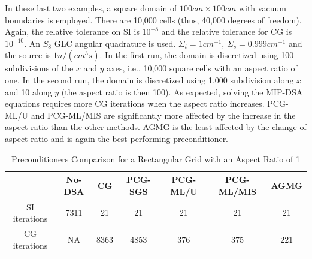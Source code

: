 \documentclass[preprint,10pt]{elsarticle}
\renewcommand{\(}{\left(}
\renewcommand{\)}{\right)}
\renewcommand{\[}{\left[}
\renewcommand{\]}{\right]}
\begin{document}
In these last two examples, a square domain  of $100cm \times 100cm$ with vacuum boundaries
is employed. There are 10,000 cells (thus, 40,000 degrees of freedom). Again, the relative 
tolerance on SI is $10^{-8}$ and the relative tolerance for CG is $10^{-10}$. 
An $S_8$ GLC angular quadrature is used. $\Sigma_t = 1cm^{-1}$, $\Sigma_s = 0.999cm^{-1}$
and the source is $1n/(cm^3s)$. 
In the first run, the domain is discretized using 100 subdivisions of the $x$ and $y$
axes, i.e., 10,000 square cells with an aspect ratio of one. In the second run, 
the domain is discretized using 1,000 subdivision along $x$ and 10 along $y$ 
(the aspect ratio is then 100).
%
As expected, solving the MIP-DSA equations requires more CG iterations when the aspect
ratio increases. PCG-ML/U and PCG-ML/MIS are significantly more affected by the
increase in the aspect ratio than the other methods. AGMG is the least
affected by the change of aspect ratio and is again the best performing
preconditioner.
%
\begin{table}[!htbp]
  \caption{Preconditioners Comparison for a Rectangular Grid with an Aspect Ratio of 1}
  \begin{center}
    \begin{tabular}{|c|c|c|c|c|c|c|}
      \hline
       & No-DSA & CG & PCG-SGS & PCG-ML/U & PCG-ML/MIS & AGMG \\
      \hline
      SI iterations & 7311      & 21      & 21      & 21       & 21      & 21 \\
      CG iterations & NA        & 8363    & 4853    & 376      & 375     &
      221\\
      \hline
    \end{tabular}
    \label{table_ar_1}
  \end{center}
\end{table}
%
\end{document}

